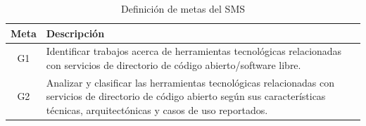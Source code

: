 \begin{table}[H]
	\centering
	\caption{Definición de metas del SMS}
	\label{tab:metas}

	\renewcommand{\arraystretch}{1.2}
	\fontsize{9pt}{10pt}\selectfont

	\begin{tabularx}{\textwidth}{|c|X|}
		\hline
		\textbf{Meta} &
		\textbf{Descripción}
		\\
		\hline
		G1            &
		Identificar trabajos acerca de herramientas tecnológicas relacionadas con servicios de directorio de código abierto/software libre.
		\\
		\hline
		G2            &
		Analizar y clasificar las herramientas tecnológicas relacionadas con servicios de directorio de código abierto según sus características técnicas, arquitectónicas y casos de uso reportados.
		\\
		\hline
	\end{tabularx}
\end{table}
